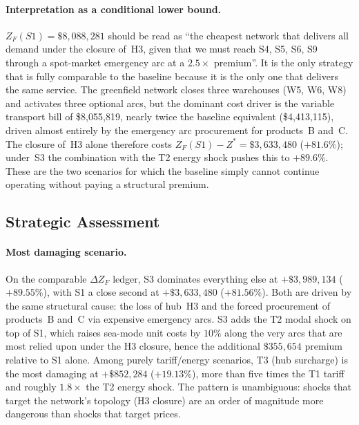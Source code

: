 \paragraph{Interpretation as a conditional lower bound.}
$Z_F(S1) = \$8{,}088{,}281$ should be read as ``the cheapest
network that delivers all demand under the closure of~H3,
given that we must reach S4, S5, S6, S9 through a spot-market
emergency arc at a $2.5\times$ premium''. It is the only strategy
that is fully comparable to the baseline because it is the only one
that delivers the same service. The greenfield network closes three
warehouses (W5, W6, W8) and activates three optional arcs, but the
dominant cost driver is the variable transport bill of
\$8{,}055{,}819, nearly twice the baseline equivalent
(\$4{,}413{,}115), driven almost entirely by the emergency arc
procurement for products~B and~C. The closure of~H3 alone therefore
costs $Z_F(S1) - Z^* = \$3{,}633{,}480$ ($+81.6\%$); under~S3
the combination with the T2 energy shock pushes this to $+89.6\%$.
These are the two scenarios for which the baseline simply cannot
continue operating without paying a structural premium.

\subsection{Strategic Assessment}
\label{sec:phase2_strategic}

\paragraph{Most damaging scenario.}
On the comparable $\Delta Z_F$ ledger, S3 dominates everything else
at $+\$3{,}989{,}134$ ($+89.55\%$), with S1 a close second at
$+\$3{,}633{,}480$ ($+81.56\%$). Both are driven by the same
structural cause: the loss of hub~H3 and the forced procurement of
products~B and~C via expensive emergency arcs. S3 adds the T2 modal
shock on top of S1, which raises sea-mode unit costs by $10\%$ along
the very arcs that are most relied upon under the H3 closure, hence
the additional $\$355{,}654$ premium relative to S1 alone. Among
purely tariff/energy scenarios, T3 (hub surcharge) is the most
damaging at $+\$852{,}284$ ($+19.13\%$), more than five times the T1
tariff and roughly $1.8\times$ the T2 energy shock. The pattern is
unambiguous: shocks that target the network's topology
(H3 closure) are an order of magnitude more dangerous than shocks
that target prices.


